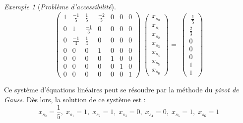 \documentclass[12pt,a4paper]{report}
\theoremstyle{definition}%
\theoremstyle{remark}
\newtheorem{example}{Exemple}[chapter]
\begin{document}
\begin{example}[\textit{Problème d'accessibilité}]
\[
\begin{pmatrix}
1 & \frac{-1}{5} & \frac{1}{5} & \frac{-2}{5} & 0 & 0 & 0 \\[0.3em]
0 & 1 & \frac{-1}{3} & 0 & 0 & 0 & 0 \\[0.3em]
0 & \frac{-1}{4} & \frac{1}{4} & 0 & 0 & 0 & 0 \\[0.3em]
0 & 0 & 0 & 1 & 0 & 0 & 0 \\[0.3em]
0 & 0 & 0 & 0 & 1 & 0 & 0 \\[0.3em]
0 & 0 & 0 & 0 & 0 & 1 & 0 \\[0.3em]
0 & 0 & 0 & 0 & 0 & 0 & 1
\end{pmatrix}
\;
\begin{pmatrix}
x_{s_0} \\[0.3em] x _{s_1} \\[0.3em] x_{s_2} \\[0.3em] x_{s_3} \\[0.3em] x_{s_4} \\[0.3em] x_{s_5} \\[0.3em] x_{s_6}
\end{pmatrix}
 = \;
\begin{pmatrix}
\; \frac{1}{5} \\[0.3em] \frac{2}{3} \\[0.3em] 0 \\[0.3em] 0 \\[0.3em] 0 \\[0.3em] 1 \\[0.3em] 1
\end{pmatrix}
\]

Ce système d'équations linéaires peut se résoudre par la méthode du \textit{pivot de Gauss}. %
Dès lors, la solution de ce système est :
\[
	x_{s_0} = \frac{1}{5}, \; x_{s_1} = 1, \; x_{s_2} = 1, \; x_{s_3} = 0, \; x_{s_4} = 0, \; x_{s_5} = 1, \; x_{s_6} = 1
\]
\end{example}
\end{document}
